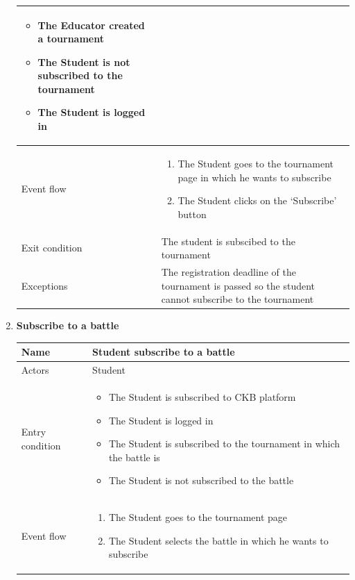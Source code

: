 \begin{enumerate}[label=UC\arabic*:]
\begin{tabular}{|p{3cm}|p{8cm}|}
\begin{itemize}
            \item The Educator created a tournament
            \item The Student is not subscribed to the tournament
            \item The Student is logged in
        \end{itemize}
        \\
        \hline
        Event flow &
        \begin{enumerate}[label=\arabic*.]
            \item The Student goes to the tournament page in which he wants to subscribe
            \item The Student clicks on the `Subscribe' button
        \end{enumerate} \\
        \hline
        Exit condition & The student is subscibed to the tournament \\
        \hline
        Exceptions & The registration deadline of the tournament is passed so
        the student cannot subscribe to the tournament \\
        \hline
    \end{tabular}
    \item \textbf{Subscribe to a battle} \\
    \begin{tabular}{|p{3cm}|p{8cm}|}
        \hline
        Name & Student subscribe to a battle \\
        \hline
        Actors & Student \\
        \hline
        Entry condition &
        \begin{itemize}
            \item The Student is subscribed to CKB platform
            \item The Student is logged in
            \item The Student is subscribed to the tournament in which the battle is
            \item The Student is not subscribed to the battle
        \end{itemize}
        \\
        \hline
        Event flow &
        \begin{enumerate}[label=\arabic*.]      
            \item The Student goes to the tournament page
            \item The Student selects the battle in which he wants to subscribe

\end{enumerate}
\end{tabular}
\end{enumerate}
